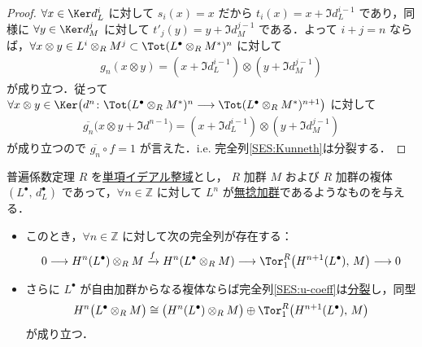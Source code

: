 \documentclass[algtopo_main]{subfiles}
\begin{document}
\begin{proof}
    $\forall x \in \Ker d_L^i$ に対して $s_i(x) = x$ だから $t_i (x) = x + \Im d_L^{i-1}$ であり，同様に $\forall y \in \Ker d_M^j$ に対して $t'_j(y) = y + \Im d_M^{j-1}$ である．よって $i+j=n$ ならば，$\forall x \otimes y \in L^i \otimes_R M^j \subset \Tot (L^\bullet \otimes_R M^*)^n$ に対して
    \begin{align}
        g_n(x \otimes y) = (x+\Im d_L^{i-1}) \otimes (y+\Im d_M^{j-1})
    \end{align}
    が成り立つ．従って $\forall x \otimes y \in \Ker \bigl(d^n\colon \Tot(L^\bullet \otimes_R M^*)^n \lto \Tot(L^\bullet \otimes_R M^*)^{n+1} \bigr)$ に対して
    \begin{align}
        \overline{g_n} \bigl( x \otimes y + \Im d^{n-1} \bigr) = (x+\Im d_L^{i-1}) \otimes (y+\Im d_M^{j-1})
    \end{align}
    が成り立つので $\overline{g_n} \circ f = 1$ が言えた．i.e. 完全列\eqref{SES:Kunneth}は分裂する．
\end{proof}

\begin{mycol}[label=thm:u-coeff]{普遍係数定理}
    $R$ を\hyperref[def:PID]{単項イデアル整域}とし，
    $R$ 加群 $M$ および $R$ 加群の複体 $(L^\bullet,\, d_L^\bullet)$ であって，$\forall n \in \mathbb{Z}$ に対して $L^n$ が\hyperref[def:torsion-free-mod]{無捻加群}であるようなものを与える．
    \begin{itemize}
        \item このとき，$\forall n \in \mathbb{Z}$ に対して次の完全列が存在する：
        \begin{align}
            \label{SES:u-coeff}
            0 \lto H^n(L^\bullet) \otimes_R M \xrightarrow{f} H^n(L^\bullet \otimes_R M) \lto \Tor_1^R \bigl( H^{n+1}(L^\bullet),\, M \bigr)  \lto 0
        \end{align}
        \item さらに $L^\bullet$ が自由加群からなる複体ならば完全列\eqref{SES:u-coeff}は\hyperref[def:split]{分裂}し，同型
        \begin{align}
            \label{isom:Kunneth}
            H^n \bigl( L^\bullet \otimes_R M\bigr) \cong \bigl( H^n(L^\bullet) \otimes_R M  \bigr) \oplus \Tor_1^R \bigl( H^{n+1} (L^\bullet),\, M \bigr) 
        \end{align}
        が成り立つ．
    \end{itemize}
\end{mycol}
\end{document}
